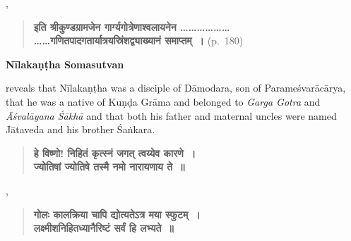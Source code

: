 \documentclass[11pt, openany]{book}
\begin{document}
\thispagestyle{empty} 
,
\begin{quote} 
\textbf{ इति श्रीकुण्डग्रामजेन गार्ग्यगोत्रेणाश्वलायनेन \ldots \ldots \ldots \ldots \ldots \ldots \\
\ldots \ldots गणितपादगतार्यात्रयस्रिंशद्व्याख्यानं समाप्तम्~।}\hspace{1 cm} (p.~180)
\end{quote}

\begin{minipage}[t]{0.15\textwidth}
\vspace{.8cm}
\textbf{{\en Nīlakaṇṭha Somasutvan}}
\end{minipage} 
\begingroup
\renewcommand{\thefootnote}{\fnsymbol{footnote}}
\begin{minipage}[t]{0.55\textwidth} 
{\en reveals that Nīlakaṇṭha was a disciple of Dāmodara, son of Parameśvarācārya, that he was a native of Kuṇḍa Grāma\makebox[0pt][l]{\footnotemark} and belonged to \emph{Garga Gotra} and \emph{Āśvalāyana Śākhā} and that both his father and maternal uncles were named Jātaveda and his brother Śaṅkara.}
\end{minipage} 	
\addtocounter{footnote}{-1}
\endgroup

\vspace{.5cm} 

\begin{quote} 
\textbf{हे विष्णो! निहितं कृत्स्नं जगत् त्वय्येव कारणे~।\\
ज्योतिषां ज्योतिषे तस्मै नमो नारायणाय ते~॥}
\end{quote}

,

\begin{quote} 
\textbf{गोलः कालक्रिया चापि द्योत्यतेऽत्र मया स्फुटम्~।\\
लक्ष्मीशनिहितध्यानैरिष्टं सर्वं हि लभ्यते~॥}
\end{quote} 

\end{document}

